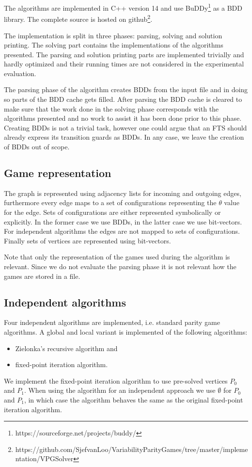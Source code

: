 The algorithms are implemented in C++ version 14 and use BuDDy\footnote{\label{note1}https://sourceforge.net/projects/buddy/} \cite{buddy} as a BDD library. The complete source is hosted on github\footnote{\label{note2}https://github.com/SjefvanLoo/VariabilityParityGames/tree/master/implementation/VPGSolver}.

The implementation is split in three phases: parsing, solving and solution printing. The solving part contains the implementations of the algorithms presented. The parsing and solution printing parts are implemented trivially and hardly optimized and their running times are not considered in the experimental evaluation.

The parsing phase of the algorithm creates BDDs from the input file and in doing so parts of the BDD cache gets filled. After parsing the BDD cache is cleared to make sure that the work done in the solving phase corresponds with the algorithms presented and no work to assist it has been done prior to this phase. Creating BDDs is not a trivial task, however one could argue that an FTS should already express its transition guards as BDDs. In any case, we leave the creation of BDDs out of scope.

\subsection{Game representation}
The graph is represented using adjacency lists for incoming and outgoing edges, furthermore every edge maps to a set of configurations representing the $\theta$ value for the edge. Sets of configurations are either represented symbolically or explicitly. In the former case we use BDDs, in the latter case we use bit-vectors. For independent algorithms the edges are not mapped to sets of configurations. Finally sets of vertices are represented using bit-vectors.

Note that only the representation of the games used during the algorithm is relevant. Since we do not evaluate the parsing phase it is not relevant how the games are stored in a file.
\subsection{Independent algorithms}
Four independent algorithms are implemented, i.e. standard parity game algorithms. A global and local variant is implemented of the following algorithms:
\begin{itemize}
	\item Zielonka's recursive algorithm and
	\item fixed-point iteration algorithm.
\end{itemize}
We implement the fixed-point iteration algorithm to use pre-solved vertices $P_0$ and $P_1$. When using the algorithm for an independent approach we use $\emptyset$ for $P_0$ and $P_1$, in which case the algorithm behaves the same as the original fixed-point iteration algorithm.

